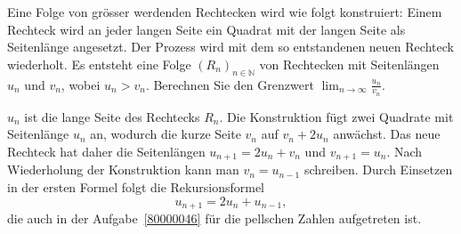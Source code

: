 Eine Folge von grösser werdenden Rechtecken wird wie folgt konstruiert:
Einem Rechteck wird an jeder langen Seite ein Quadrat mit der langen Seite
als Seitenlänge angesetzt.
Der Prozess wird mit dem so entstandenen neuen Rechteck wiederholt.
Es entsteht eine Folge $(R_n)_{n\in\mathbb{N}}$ von Rechtecken
mit Seitenlängen $u_n$ und $v_n$, wobei $u_n>v_n$.
Berechnen Sie den Grenzwert $\lim_{n\to\infty} \frac{u_n}{v_n}$.

\begin{loesung}
$u_n$ ist die lange Seite des Rechtecks $R_n$.
Die Konstruktion fügt zwei Quadrate mit Seitenlänge $u_n$ an, wodurch
die kurze Seite $v_n$ auf $v_n+2u_n$ anwächst. 
Das neue Rechteck hat daher die Seitenlängen $u_{n+1}=2u_n + v_n$ und
$v_{n+1}=u_n$.
Nach Wiederholung der Konstruktion kann man $v_n = u_{n-1}$ schreiben.
Durch Einsetzen in der ersten Formel folgt die Rekursionsformel
\begin{equation}
u_{n+1} = 2u_n + u_{n-1},
\label{80000047:rekursion}
\end{equation}
die auch in der Aufgabe~\ref{80000046} für die pellschen Zahlen
aufgetreten ist.


\end{loesung}
